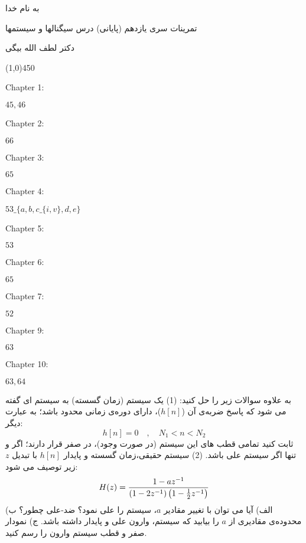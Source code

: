 \documentclass[50pt]{article}
\newcommand{\hl}{
\begin{center}
\line(1,0){450}
\end{center}}
\begin{document}
\setLTR 




\begin{RTL}
\Large{








\begin{center}
به نام خدا

تمرینات سری یازدهم (پایانی) درس سیگنالها و سیستمها

دکتر لطف الله بیگی
\end{center}

\hl
\begin{latin}
Chapter 1:

$45,46$

Chapter 2:

$66$

Chapter 3:

$65$

Chapter 4:

$53\_\Big\{a,b,c\_\{i,v\},d,e\Big\}$

Chapter 5:

$53$

Chapter 6:

$65$

Chapter 7:

$52$

Chapter 9:

$63$

Chapter 10:

$63,64$


\end{latin}
به علاوه سوالات زیر را حل کنید:
\newline
(1) یک سیستم  (زمان گسسته) به سیستم  ای گفته می شود که پاسخ ضربه‌ی آن ($h[n]$)، دارای دوره‌ی زمانی محدود باشد؛ به عبارت دیگر:
\[
h[n]=0\quad,\quad N_1<n<N_2
\]
ثابت کنید تمامی قطب های این سیستم (در صورت وجود)، در صفر قرار دارند؛ اگر و تنها اگر سیستم علی باشد.
\newline
(2) سیستم حقیقی،زمان گسسته و پایدار $h[n]$ با تبدیل $z$ زیر توصیف می شود:
\[
H(z)={1-az^{-1}\over (1-2z^{-1})\left(1-{1\over 2}z^{-1}\right)}
\]
الف) آیا می توان با تغییر مقادیر $a$، سیستم را علی نمود؟ ضد-علی چطور؟
\newline
ب) محدوده‌ی مقادیری از $a$ را بیابید که سیستم، وارون علی و پایدار داشته باشد.
\newline
ج) نمودار صفر و قطب سیستم وارون را رسم کنید.



}





\end{RTL}
\end{document}
